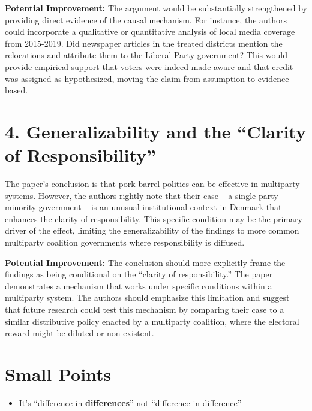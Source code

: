 \documentclass[
  letterpaper,
  DIV=11,
  numbers=noendperiod]{scrartcl}
\providecommand{\tightlist}{%
  \setlength{\itemsep}{0pt}\setlength{\parskip}{0pt}}\usepackage{longtable,booktabs,array}
\begin{document}
\textbf{Potential Improvement:} The argument would be substantially
strengthened by providing direct evidence of the causal mechanism. For
instance, the authors could incorporate a qualitative or quantitative
analysis of local media coverage from 2015-2019. Did newspaper articles
in the treated districts mention the relocations and attribute them to
the Liberal Party government? This would provide empirical support that
voters were indeed made aware and that credit was assigned as
hypothesized, moving the claim from assumption to evidence-based.

\section{4. Generalizability and the ``Clarity of
Responsibility''}\label{generalizability-and-the-clarity-of-responsibility}

The paper's conclusion is that pork barrel politics can be effective in
multiparty systems. However, the authors rightly note that their case --
a single-party minority government -- is an unusual institutional
context in Denmark that enhances the clarity of responsibility. This
specific condition may be the primary driver of the effect, limiting the
generalizability of the findings to more common multiparty coalition
governments where responsibility is diffused.

\textbf{Potential Improvement:} The conclusion should more explicitly
frame the findings as being conditional on the ``clarity of
responsibility.'' The paper demonstrates a mechanism that works under
specific conditions within a multiparty system. The authors should
emphasize this limitation and suggest that future research could test
this mechanism by comparing their case to a similar distributive policy
enacted by a multiparty coalition, where the electoral reward might be
diluted or non-existent.

\section{Small Points}\label{small-points}

\begin{itemize}
\tightlist
\item
  It's ``difference-in-\textbf{differences}'' not
  ``difference-in-difference''
\end{itemize}
\end{document}
